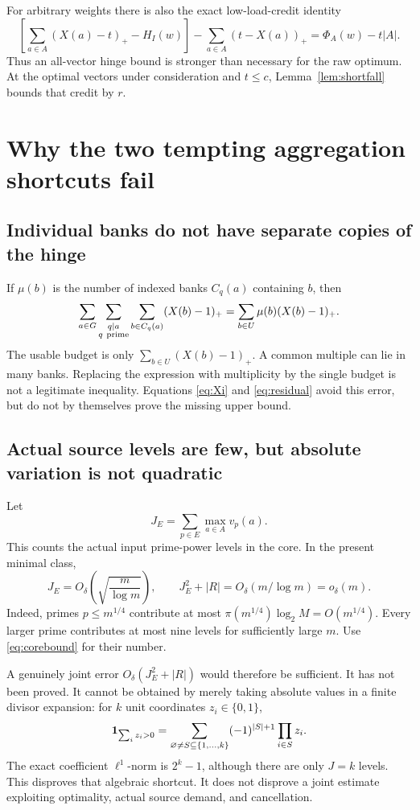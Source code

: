 \documentclass[11pt,a4paper]{article}
\theoremstyle{remark}
\newcommand{\pos}[1]{(#1)_+}
\begin{document}
For arbitrary weights there is also the exact low-load-credit
identity
\begin{equation}
 \left[\sum_{a\in A}\pos{X(a)-t}-H_I(w)\right]
 -\sum_{a\in A}\pos{t-X(a)}
 =\Phi_A(w)-t|A|.
 \label{eq:credit}
\end{equation}
Thus an all-vector hinge bound is stronger than necessary for the
raw optimum. At the optimal vectors under consideration and
\(t\le c\), Lemma~\ref{lem:shortfall} bounds that credit by \(r\).

\section{Why the two tempting aggregation shortcuts fail}

\subsection{Individual banks do not have separate copies of the hinge}

If \(\mu(b)\) is the number of indexed banks \(C_q(a)\) containing
\(b\), then
\[
 \sum_{a\in G}\sum_{\substack{q\mid a\\q\ {\rm prime}}}
       \sum_{b\in C_q(a)}
       \pos{X(b)-1}
 =\sum_{b\in U}\mu(b)\pos{X(b)-1}.
\]
The usable budget is only
\(\sum_{b\in U}\pos{X(b)-1}\). A common multiple can lie in many
banks. Replacing the expression with multiplicity by the single
budget is not a legitimate inequality. Equations
\eqref{eq:Xi} and \eqref{eq:residual} avoid this error, but do not
by themselves prove the missing upper bound.

\subsection{Actual source levels are few, but absolute variation is not quadratic}

Let
\[
 J_E=\sum_{p\in E}\max_{a\in A}v_p(a).
\]
This counts the actual input prime-power levels in the core. In
the present minimal class,
\begin{equation}
 J_E=O_\delta\!\left(\sqrt{\frac m{\log m}}\right),\qquad
 J_E^2+|R|=O_\delta(m/\log m)=o_\delta(m).
 \label{eq:levels}
\end{equation}
Indeed, primes \(p\le m^{1/4}\) contribute at most
\(\pi(m^{1/4})\log_2 M=O(m^{1/4})\). Every larger prime
contributes at most nine levels for sufficiently large \(m\).
Use \eqref{eq:corebound} for their number.

A genuinely joint error \(O_\delta(J_E^2+|R|)\) would therefore
be sufficient. It has not been proved. It cannot be obtained
by merely taking absolute values in a finite divisor expansion:
for \(k\) unit coordinates \(z_i\in\{0,1\}\),
\[
 {\bf1}_{\sum_i z_i>0}
 =\sum_{\varnothing\ne S\subseteq\{1,\ldots,k\}}
       (-1)^{|S|+1}\prod_{i\in S}z_i.
\]
The exact coefficient \(\ell^1\)-norm is \(2^k-1\), although
there are only \(J=k\) levels. This disproves that algebraic
shortcut. It does not disprove a joint estimate exploiting
optimality, actual source demand, and cancellation.
\end{document}
